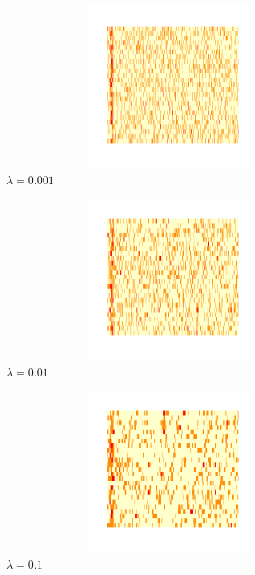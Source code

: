 \documentclass[12pt,twoside]{reedthesis}
\begin{document}
  \begin{figure}
  
  {\centering \includegraphics[width=400px,height=200px]{figure/ancestry_heatmap_lambda_0001} 
  
  }
  
  \caption{$\lambda = 0.001$}\label{fig:lambda0001}
  \end{figure}\begin{figure}
  
  {\centering \includegraphics[width=400px,height=200px]{figure/ancestry_heatmap_lambda_001} 
  
  }
  
  \caption{$\lambda = 0.01$}\label{fig:lambda001}
  \end{figure}\begin{figure}
  
  {\centering \includegraphics[width=400px,height=200px]{figure/ancestry_heatmap_lambda_01} 
  
  }
  
  \caption{$\lambda = 0.1$}\label{fig:lambda01}
  \end{figure}
  
\end{document}
